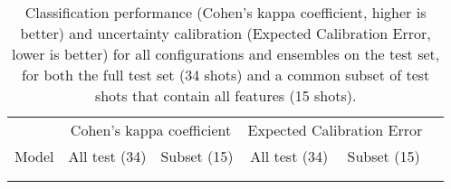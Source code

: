 \def\arrvline{\hfil\kern\arraycolsep\vline\kern-\arraycolsep\hfilneg}
\setlength\tabcolsep{5.3pt}
\begingroup
\centering
\begin{longtable}{lccccc}

 & \multicolumn{2}{c}{Cohen's kappa coefficient}  & \multicolumn{2}{c}{Expected Calibration Error} \\\cmidrule[\heavyrulewidth]{2-6}
Model & All test (34) & Subset (15) & All test (34) & Subset (15)\\
\cmidrule[\heavyrulewidth]{1-6}
\addlinespace[-\belowrulesep]

\\
\caption{Classification performance (Cohen's kappa coefficient, higher is better) and uncertainty calibration (Expected Calibration Error, lower is better) for all configurations and ensembles on the test set, for both the full test set (34 shots) and a common subset of test shots that contain all features (15 shots).}\label{tab:allresults}
\end{longtable}
\endgroup
\setlength\tabcolsep{6pt}
